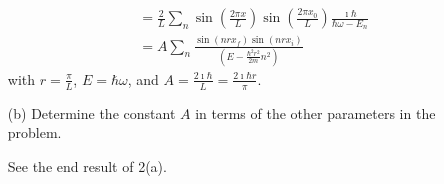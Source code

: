 \documentclass[a4paper,twoside]{article}
\begin{document}
\begin{itemize}
\begin{problem}
\begin{align}
                &= \frac{2}{L} \sum_n \sin(\frac{2 \pi x}{L}) \sin(\frac{2 \pi x_0}{L}) \frac{\imath \hbar}{\hbar \omega - E_n} \\
                &= A \sum_n \frac{\sin(nrx_f) \sin(nrx_i)}{(E - \frac{\hbar^2 r^2}{2m} n^2)}
            \end{align}
            with $ r = \frac{\pi}{L} $, $ E = \hbar \omega $, and $ A = \frac{2 \imath \hbar}{L} = \frac{2 \imath \hbar r}{\pi} $.
        \end{problem}
    \item[(b)] Determine the constant $ A $ in terms of the other parameters in the problem.
        \begin{problem}
            See the end result of 2(a).
        \end{problem}
\end{itemize}
\end{document}
